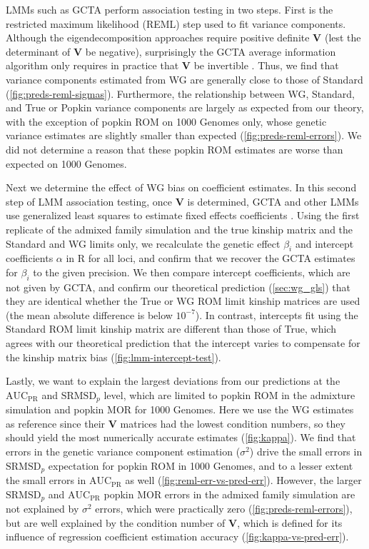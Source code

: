 \documentclass[11pt]{article}
\newcommand{\rmsd}{\text{SRMSD}_p}
\newcommand{\auc}{\text{AUC}_\text{PR}}
\begin{document}
LMMs such as GCTA perform association testing in two steps.
First is the restricted maximum likelihood (REML) step used to fit variance components.
Although the eigendecomposition approaches \citep{kang_efficient_2008, lippert_fast_2011, svishcheva_rapid_2012, zhou_genome-wide_2012, sul_population_2018} require positive definite $\mathbf{V}$ (lest the determinant of $\mathbf{V}$ be negative), surprisingly the GCTA average information algorithm only requires in practice that $\mathbf{V}$ be invertible \citep{yang_gcta:_2011}.
Thus, we find that variance components estimated from WG are generally close to those of Standard (\cref{fig:preds-reml-sigmas}).
Furthermore, the relationship between WG, Standard, and True or Popkin variance components are largely as expected from our theory, with the exception of popkin ROM on 1000 Genomes only, whose genetic variance estimates are slightly smaller than expected (\cref{fig:preds-reml-errors}).
We did not determine a reason that these popkin ROM estimates are worse than expected on 1000 Genomes.

Next we determine the effect of WG bias on coefficient estimates.
In this second step of LMM association testing, once $\mathbf{V}$ is determined, GCTA and other LMMs use generalized least squares to estimate fixed effects coefficients \citep{kang_efficient_2008, kang_variance_2010, yang_advantages_2014}.
Using the first replicate of the admixed family simulation and the true kinship matrix and the Standard and WG limits only, we recalculate the genetic effect $\beta_i$ and intercept coefficients $\alpha$ in R for all loci, and confirm that we recover the GCTA estimates for $\beta_i$ to the given precision.
We then compare intercept coefficients, which are not given by GCTA, and confirm our theoretical prediction (\cref{sec:wg_gls}) that they are identical whether the True or WG ROM limit kinship matrices are used (the mean absolute difference is below $10^{-7}$).
In contrast, intercepts fit using the Standard ROM limit kinship matrix are different than those of True, which agrees with our theoretical prediction that the intercept varies to compensate for the kinship matrix bias (\cref{fig:lmm-intercept-test}).

Lastly, we want to explain the largest deviations from our predictions at the $\auc$ and $\rmsd$ level, which are limited to popkin ROM in the admixture simulation and popkin MOR for 1000 Genomes.
Here we use the WG estimates as reference since their $\mathbf{V}$ matrices had the lowest condition numbers, so they should yield the most numerically accurate estimates (\cref{fig:kappa}).
We find that errors in the genetic variance component estimation ($\sigma^2$) drive the small errors in $\rmsd$ expectation for popkin ROM in 1000 Genomes, and to a lesser extent the small errors in $\auc$ as well (\cref{fig:reml-err-vs-pred-err}).
However, the larger $\rmsd$ and $\auc$ popkin MOR errors in the admixed family simulation are not explained by $\sigma^2$ errors, which were practically zero (\cref{fig:preds-reml-errors}), but are well explained by the condition number of $\mathbf{V}$, which is defined for its influence of regression coefficient estimation accuracy (\cref{fig:kappa-vs-pred-err}).
\end{document}
